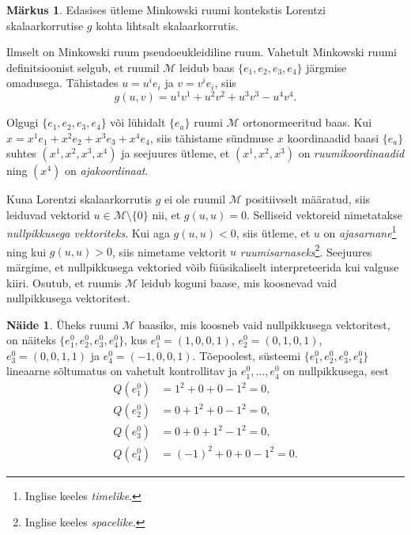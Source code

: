 \documentclass[12pt,a4paper,oneside]{article}
\theoremstyle{plain}
\theoremstyle{definition}
\newtheorem{naide}{Näide}[section]
\newtheorem{markus}{Märkus}[section]
\numberwithin{equation}{section}
\def\M{{\mathcal M}}
\begin{document}
\begin{markus}
Edasises ütleme Minkowski ruumi kontekstis Lorentzi skalaarkorrutise 
$g$ kohta lihtsalt skalaarkorrutis.
\end{markus}

Ilmselt on Minkowski ruum pseudoeukleidiline ruum. Vahetult Minkowski 
ruumi definitsioonist selgub, et ruumil $\M$ leidub baas 
$\{e_1, e_2, e_3, e_4\}$ järgmise omadusega. Tähistades 
$u = u^i e_i$ ja $v = v^i e_i$, siis
\[g\left(u, v\right) = u^1 v^1 + u^2 v^2 + u^3 v^3 - u^4 v^4.\]

Olgugi $\{e_1, e_2, e_3, e_4\}$ või lühidalt $\{e_a\}$ ruumi $\M$ 
ortonormeeritud baas. Kui $x = x^1 e_1 + x^2 e_2 + x^3 e_3 + x^4 e_4$, 
siis tähistame sündmuse $x$ koordinaadid baasi $\{e_a\}$ suhtes 
$\left( x^1, x^2, x^3, x^4 \right)$ ja seejuures ütleme, et 
$\left( x^1, x^2, x^3 \right)$ on \emph{ruumikoordinaadid} ning 
$\left(x^4\right)$ on \emph{ajakoordinaat}.

Kuna Lorentzi skalaarkorrutis $g$ ei ole ruumil $\M$ positiivselt 
määratud, siis leiduvad vektorid $u \in \M \setminus \{0\}$ nii, 
et $g \left(u, u\right) = 0$. Selliseid vektoreid nimetatakse 
\emph{nullpikkusega vektoriteks}. Kui aga $g \left(u, u\right) < 0$, 
siis ütleme, et $u$ on \emph{ajasarnane}\footnote{Inglise keeles 
\textit{timelike}.} ning kui $g \left(u, u\right) > 0$, siis nimetame 
vektorit $u$ \emph{ruumisarnaseks}\footnote{Inglise keeles 
\textit{spacelike}.}. Seejuures märgime, et nullpikkusega 
vektoried võib füüsikaliselt interpreteerida kui valguse kiiri.
Osutub, et ruumis $\M$ leidub koguni baase, mis koosnevad 
vaid nullpikkusega vektoritest.

\begin{naide}
Üheks ruumi $\M$ baasiks, mis koosneb vaid nullpikkusega vektoritest, 
on näiteks $\{e_1^0, e_2^0, e_3^0, e_4^0\}$, kus 
$e_1^0 = \left(1, 0, 0, 1\right)$, $e_2^0 = \left(0, 1, 0, 1\right)$, 
$e_3^0 = \left(0, 0, 1, 1\right)$ ja $e_4^0 = 
\left(-1, 0, 0, 1\right).$
Tõepoolest, süsteemi $\{e_1^0, e_2^0, e_3^0, e_4^0\}$ lineaarne 
sõltumatus on vahetult kontrollitav ja $e_1^0, \dots, e_4^0$ on 
nullpikkusega, sest
\begin{align*}
Q\left(e_1^0\right) &= 1^2 + 0 + 0 - 1^2 = 0, \\
Q\left(e_2^0\right) &= 0 + 1^2 + 0 - 1^2 = 0, \\
Q\left(e_3^0\right) &= 0 + 0 + 1^2 - 1^2 = 0, \\
Q\left(e_4^0\right) &= (-1)^2 + 0 + 0 - 1^2 = 0.
\end{align*}
\end{naide}
\end{document}
